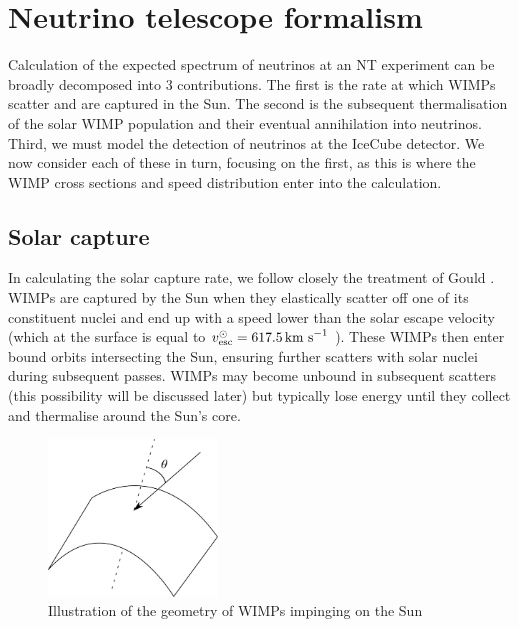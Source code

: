 \section{Neutrino telescope formalism}

Calculation of the expected spectrum of neutrinos at an NT experiment can be broadly decomposed into 3 contributions. The first is the rate at which WIMPs scatter and are captured in the Sun. The second is the subsequent thermalisation of the solar WIMP population and their eventual annihilation into neutrinos. Third, we must model the detection of neutrinos at the IceCube detector. We now consider each of these in turn, focusing on the first, as this is where the WIMP cross sections and speed distribution enter into the calculation.

\subsection{Solar capture}

In calculating the solar capture rate, we follow closely the treatment of Gould \cite{Gould:1987,Gould:1992}. WIMPs are captured by the Sun when they elastically scatter off one of its constituent nuclei and end up with a speed lower than the solar escape velocity (which at the surface is equal to \(v_{\textrm{esc}}^\odot = 617.5 \,\textrm{km s}^{-1}\) \cite{Kaufmann:1991}). These WIMPs then enter bound orbits intersecting the Sun, ensuring further scatters with solar nuclei during subsequent passes. WIMPs may become unbound in subsequent scatters (this possibility will be discussed later) but typically lose energy until they collect and thermalise around the Sun's core.

\begin{figure}[h!]
    \centering
    \includegraphics[width=0.4\textwidth]{NT/Surface.pdf}
\caption[Geometry of WIMPs impinging on the Sun]{Illustration of the geometry of WIMPs impinging on the Sun}
\label{fig:NT:geometry}
\end{figure}

